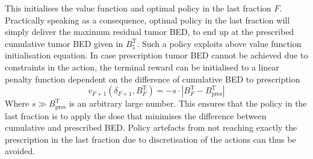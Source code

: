 \documentclass[\relativeRoot/ada.tex]{subfiles}
\begin{document}
This initialises the value function and optimal policy in the last fraction $F$. Practically speaking as a consequence, optimal policy in the last fraction will simply deliver the maximum residual tumor BED, to end up at the prescribed cumulative tumor BED given in $B_5^{\text{T}}$. Such a policy exploits above value function initialisation equation. In case prescription tumor BED cannot be achieved due to constraints in the action, the terminal reward can be initialised to a linear penalty function dependent on the difference of cumulative BED to prescription
\begin{equation*}
v_{F+1}(\delta_{F+1}, B^\text{T}_{F}) = 
- s \cdot \left| B^\text{T}_F - B_{\text{pres}}^\text{T} \right|
\end{equation*}
Where $s \gg B_{\text{pres}}^\text{T}$ is an arbitrary large number. This ensures that the policy in the last fraction is to apply the dose that minimises the difference between cumulative and prescribed BED. Policy artefacts from not reaching exactly the prescription in the last fraction due to discretisation of the actions can thus be avoided.
\end{document}
